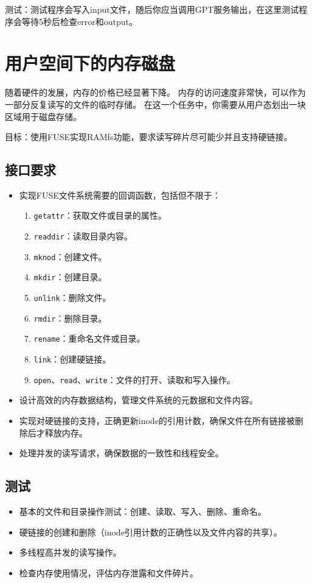测试：测试程序会写入input文件，随后你应当调用GPT服务输出，在这里测试程序会等待5秒后检查error和output。


\section{用户空间下的内存磁盘}
随着硬件的发展，内存的价格已经显著下降。
内存的访问速度非常快，可以作为一部分反复读写的文件的临时存储。
在这一个任务中，你需要从用户态划出一块区域用于磁盘存储。

目标：使用FUSE实现RAMfs功能，要求读写碎片尽可能少并且支持硬链接。

\subsection{接口要求}

\begin{itemize}
\item 实现FUSE文件系统需要的回调函数，包括但不限于：
\begin{enumerate}
\item \texttt{getattr}：获取文件或目录的属性。
\item \texttt{readdir}：读取目录内容。
\item \texttt{mknod}：创建文件。
\item \texttt{mkdir}：创建目录。
\item \texttt{unlink}：删除文件。
\item \texttt{rmdir}：删除目录。
\item \texttt{rename}：重命名文件或目录。
\item \texttt{link}：创建硬链接。
\item \texttt{open}、\texttt{read}、\texttt{write}：文件的打开、读取和写入操作。
\end{enumerate}
\item 设计高效的内存数据结构，管理文件系统的元数据和文件内容。
\item 实现对硬链接的支持，正确更新inode的引用计数，确保文件在所有链接被删除后才释放内存。
\item 处理并发的读写请求，确保数据的一致性和线程安全。
\end{itemize}

\subsection{测试}

\begin{itemize}
\item 基本的文件和目录操作测试：创建、读取、写入、删除、重命名。
\item 硬链接的创建和删除（inode引用计数的正确性以及文件内容的共享）。
\item 多线程高并发的读写操作。
\item 检查内存使用情况，评估内存泄露和文件碎片。
\end{itemize}

